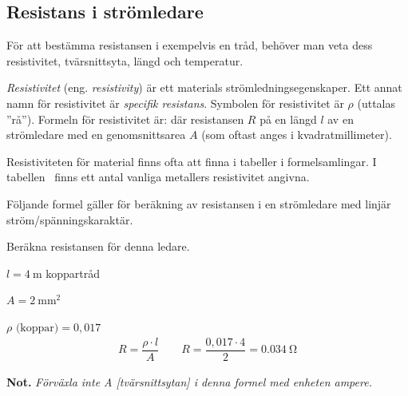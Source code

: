 \subsection{Resistans i strömledare}

För att bestämma resistansen i exempelvis en tråd, behöver man veta dess 
resistivitet, tvärsnittsyta, längd och temperatur.

\emph{Resistivitet} (eng. \emph{resistivity}) är ett materials
strömledningsegenskaper.
Ett annat namn för resistivitet är \emph{specifik resistans}.
Symbolen för resistivitet är \(\rho\) (uttalas ''rå'').
Formeln för resistivitet är:
där resistansen \(R\) på en längd \(l\) av en strömledare med en
genomsnittsarea \(A\) (som oftast anges i kvadratmillimeter).

Resistiviteten för material finns ofta att finna i tabeller i formelsamlingar.
I tabellen~ finns ett antal vanliga metallers
resistivitet angivna.

Följande formel gäller för beräkning av resistansen i en strömledare med linjär
ström/spänningskaraktär.
\noindent
\begin{exempelbox}
Beräkna resistansen för denna ledare.

\(l = \qty{4}{\metre}\) koppartråd

\(A = \qty{2}{\milli\metre\squared}\)

\(\rho \text{ (koppar)} = 0,017\)
\tcblower
\noindent
\[\begin{array}{c}
R = \dfrac{\rho \cdot l}{A} \qquad R = \dfrac{0,017 \cdot 4}{2} = \qty{0,034}{\ohm}
\end{array}\]

\noindent
\textbf{Not.} \emph{Förväxla inte A [tvärsnittsytan] i denna formel med enheten ampere.}
\end{exempelbox}

